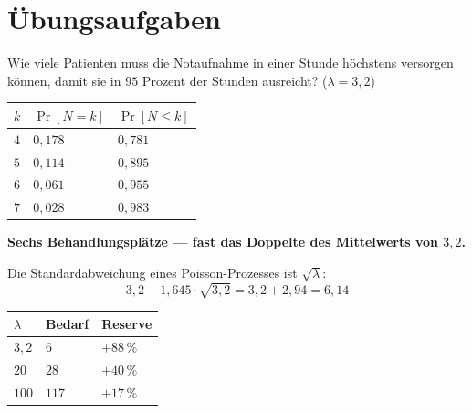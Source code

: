\section{Übungsaufgaben}

\begin{aufgabe}
Wie viele Patienten muss die Notaufnahme in einer Stunde höchstens versorgen können, damit sie in $95$ Prozent der Stunden ausreicht? ($\lambda = 3{,}2$)

\loesung
{}
\begin{center}
{\small
\renewcommand{\arraystretch}{1.46}
\begin{tabular}{@{}P{1.4cm}P{2.2cm}P{2.4cm}@{}}
\toprule
$k$ & $\Pr[N=k]$ & $\Pr[N\le k]$\\
\midrule
$4$ & $0{,}178$ & $0{,}781$\\
$5$ & $0{,}114$ & $0{,}895$\\
$6$ & $0{,}061$ & $0{,}955$\\
$7$ & $0{,}028$ & $0{,}983$\\
\bottomrule
\end{tabular}}
\end{center}

\begin{center}
\begin{minipage}{0.9\textwidth}
\textbf{Sechs Behandlungsplätze --- fast das Doppelte des Mittelwerts von $3{,}2$.}
\end{minipage}
\end{center}

Die Standardabweichung eines Poisson-Prozesses ist $\sqrt{\lambda}$:
\[ 3{,}2 + 1{,}645\cdot\sqrt{3{,}2} = 3{,}2 + 2{,}94 = 6{,}14 \]

\begin{center}
{\small
\renewcommand{\arraystretch}{1.48}
\begin{tabular}{@{}P{1.8cm}P{2.2cm}P{2.6cm}@{}}
\toprule
$\lambda$ & \textbf{Bedarf} & \textbf{Reserve}\\
\midrule
$3{,}2$ & $6$ & $+88\,\%$\\
$20$ & $28$ & $+40\,\%$\\
$100$ & $117$ & $+17\,\%$\\
\bottomrule
\end{tabular}}
\end{center}

\begin{center}
\begin{minipage}{0.88\textwidth}
\end{minipage}
\end{center}
\end{aufgabe}

